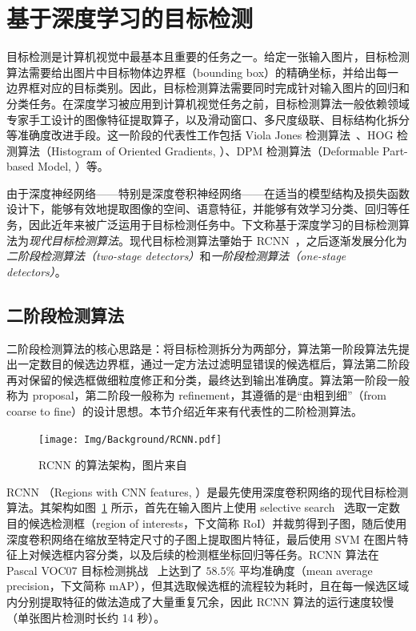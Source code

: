 \section{基于深度学习的目标检测}
目标检测是计算机视觉中最基本且重要的任务之一。给定一张输入图片，目标检测算法需要给出图片中目标物体边界框（bounding box）的精确坐标，并给出每一边界框对应的目标类别。因此，目标检测算法需要同时完成针对输入图片的回归和分类任务。在深度学习被应用到计算机视觉任务之前，目标检测算法一般依赖领域专家手工设计的图像特征提取算子，以及滑动窗口、多尺度级联、目标结构化拆分等准确度改进手段。这一阶段的代表性工作包括 Viola Jones 检测算法~\citep{viola2001rapid, viola2004robust}、HOG 检测算法（Histogram of Oriented Gradients, \citet{dalal2005histograms}）、DPM 检测算法（Deformable Part-based Model, \citet{felzenszwalb2008discriminatively, felzenszwalb2009object, girshick2011object, girshick2012rigid}）等。

由于深度神经网络——特别是深度卷积神经网络——在适当的模型结构及损失函数设计下，能够有效地提取图像的空间、语意特征，并能够有效学习分类、回归等任务，因此近年来被广泛运用于目标检测任务中。下文称基于深度学习的目标检测算法为\emph{现代目标检测算法}。现代目标检测算法肇始于 RCNN~\citep{girshick2015region}，之后逐渐发展分化为\emph{二阶段检测算法（two-stage detectors）}和\emph{一阶段检测算法（one-stage detectors）}。
\subsection{二阶段检测算法}
二阶段检测算法的核心思路是：将目标检测拆分为两部分，算法第一阶段算法先提出一定数目的候选边界框，通过一定方法过滤明显错误的候选框后，算法第二阶段再对保留的候选框做细粒度修正和分类，最终达到输出准确度。算法第一阶段一般称为 proposal，第二阶段一般称为 refinement，其遵循的是“由粗到细”（from coarse to fine）的设计思想。本节介绍近年来有代表性的二阶检测算法。

\begin{figure}[htb]
  \centering
  \texttt{[image: Img/Background/RCNN.pdf]}
  \caption{RCNN 的算法架构，图片来自~\citet{girshick2015region}}
  \label{img::background::RCNN}
\end{figure}

RCNN （Regions with CNN features, \citet{girshick2015region}）是最先使用深度卷积网络的现代目标检测算法。其架构如图~\ref{img::background::RCNN} 所示，首先在输入图片上使用 selective search~\citep{van2011segmentation} 选取一定数目的候选检测框（region of interests，下文简称 RoI）并裁剪得到子图，随后使用深度卷积网络在缩放至特定尺寸的子图上提取图片特征，最后使用 SVM 在图片特征上对候选框内容分类，以及后续的检测框坐标回归等任务。RCNN 算法在 Pascal VOC07 目标检测挑战~\citep{Everingham10} 上达到了 $58.5\%$ 平均准确度（mean average precision，下文简称 mAP），但其选取候选框的流程较为耗时，且在每一候选区域内分别提取特征的做法造成了大量重复冗余，因此 RCNN 算法的运行速度较慢（单张图片检测时长约 14 秒）。


